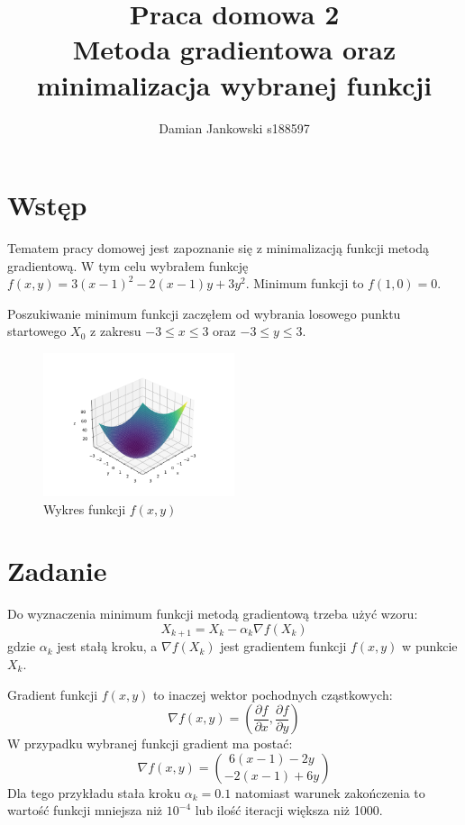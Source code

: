 \documentclass{article}
\title{Praca domowa 2\\Metoda gradientowa oraz\\
minimalizacja wybranej funkcji}
\author{Damian Jankowski s188597}
\begin{document}
\maketitle

\section{Wstęp}
Tematem pracy domowej jest zapoznanie się z minimalizacją funkcji
metodą gradientową. W tym celu wybrałem funkcję
$f(x, y) = 3(x-1)^2-2(x-1)y+3y^2$. Minimum funkcji to $f(1, 0) = 0$.

Poszukiwanie minimum funkcji
zaczęłem od wybrania losowego punktu startowego $X_0$ z zakresu
$-3 \le x \le 3$ oraz $-3 \le y \le 3$.

\begin{figure}[H]
    \centering
    \includegraphics[width=0.5\textwidth]{function.png}
    \caption{Wykres funkcji $f(x, y)$}
\end{figure}


\section{Zadanie}
Do wyznaczenia minimum funkcji metodą gradientową trzeba użyć
wzoru:
\begin{equation}
X_{k+1} = X_k - \alpha_k \nabla f(X_k)
\end{equation}
gdzie $\alpha_k$ jest stałą kroku, 
a $\nabla f(X_k)$ jest gradientem
funkcji $f(x, y)$ w punkcie $X_k$.

Gradient funkcji $f(x, y)$ to inaczej wektor pochodnych
cząstkowych:
\begin{equation}
\nabla f(x, y) = \left( \frac{\partial f}{\partial x}, \frac{\partial f}{\partial y} \right)
\end{equation}
W przypadku wybranej funkcji gradient ma postać:
\begin{equation}
\nabla f(x, y) = {6(x - 1)-2y \choose -2(x-1)+6y}
\end{equation}
Dla tego przykładu stała kroku $\alpha_k = 0.1$ natomiast
warunek zakończenia to wartość funkcji mniejsza niż $10^{-4}$ lub 
ilość iteracji większa niż 1000.
\end{document}
